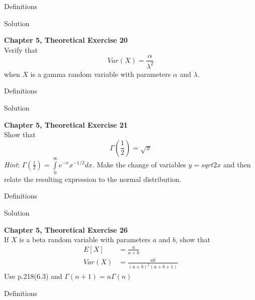 \documentclass{article}
\begin{document}
\begin{spacing}{1.1}
\begin{homeworkProblem}
\begin{homeworkSection}{Definitions}
    
  \end{homeworkSection}
  \begin{homeworkSection}{Solution}
    
  \end{homeworkSection}
\end{homeworkProblem}

\newpage
\begin{homeworkProblem}
  {\bf Chapter 5, Theoretical Exercise 20}\\
  Verify that
  \[Var( X) = \frac{ \alpha}{ \lambda^2}\]
  when $X$ is a gamma random variable with parameters $\alpha$ and $\lambda$.
  \begin{homeworkSection}{Definitions}
    
    
  \end{homeworkSection}
  \begin{homeworkSection}{Solution}
    
  \end{homeworkSection}
\end{homeworkProblem}

\newpage
\begin{homeworkProblem}
  {\bf Chapter 5, Theoretical Exercise 21}\\
  Show that 
  \[\Gamma \left(\frac{ 1}{ 2}\right) = \sqrt{ \pi}\]
  \emph{Hint}: $\Gamma\left( \frac{ 1}{ 2}\right) = \int\limits_0^{\infty} e^{-x} x^{-1/2} dx$. 
  Make the change of variables $y = sqrt{ 2x}$ and then relate the resulting expression
  to the normal distribution.
  \begin{homeworkSection}{Definitions}
    
    
  \end{homeworkSection}
  \begin{homeworkSection}{Solution}
    
  \end{homeworkSection}
\end{homeworkProblem}

\newpage
\begin{homeworkProblem}
  {\bf Chapter 5, Theoretical Exercise 26}\\
  If $X$ is a beta random variable with parameters $a$ and $b$, show that
  \begin{align*}
    E[ X]   &= \frac{ a}{ a + b}\\
    Var( X) &= \frac{ a b}{ (a + b)^2 (a + b + 1)}
  \end{align*}
  Use p.218(6.3) and $\Gamma( n + 1) = n \Gamma( n)$
  \begin{homeworkSection}{Definitions}
    

\end{homeworkSection}
\end{homeworkProblem}
\end{spacing}
\end{document}

